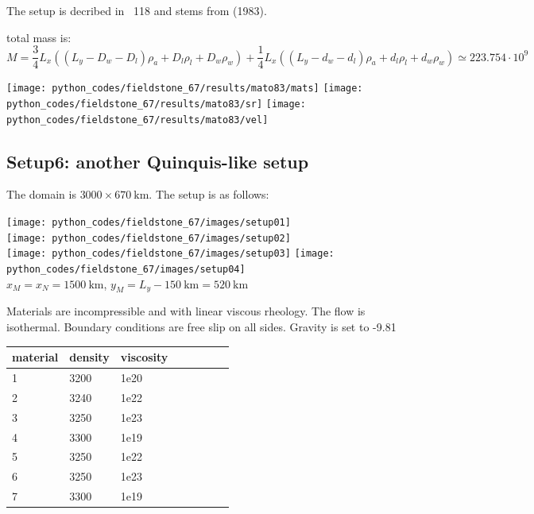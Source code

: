 The setup is decribed in \stone~118 and stems from \textcite{mato83} (1983). 

total mass is:
\[
M=\frac34 L_x \left( (L_y-D_w-D_l) \rho_a + D_l \rho_l + D_w \rho_w \right)
+ \frac14 L_x \left( (L_y-d_w-d_l) \rho_a + d_l \rho_l + d_w \rho_w \right)
\simeq 223.754\cdot10^9 
\]


\begin{center}
\texttt{[image: python\_codes/fieldstone\_67/results/mato83/mats]}
\texttt{[image: python\_codes/fieldstone\_67/results/mato83/sr]}
\texttt{[image: python\_codes/fieldstone\_67/results/mato83/vel]}
\end{center}



\newpage
\subsection*{Setup6: another Quinquis-like setup}

The domain is $3000\times 670~\si{\km}$. The setup is as follows:

\begin{center}
\texttt{[image: python\_codes/fieldstone\_67/images/setup01]}\\
\texttt{[image: python\_codes/fieldstone\_67/images/setup02]}\\
\texttt{[image: python\_codes/fieldstone\_67/images/setup03]}
\texttt{[image: python\_codes/fieldstone\_67/images/setup04]}\\
{\captionfont $x_M=x_N=1500~\si{\km}$, $y_M=L_y-150~\si{\km}=520~\si{\km}$}
\end{center}

Materials are incompressible and with linear viscous rheology. The
flow is isothermal. Boundary conditions are free slip on all
sides. Gravity is set to -9.81

\begin{center}
\begin{tabular}{llllllll}
\hline
material & density & viscosity \\
\hline\hline
1& 3200& 1e20\\ 
2& 3240& 1e22\\
3& 3250& 1e23\\
4& 3300& 1e19\\
5& 3250& 1e22\\
6& 3250& 1e23\\
7& 3300& 1e19\\
\hline
\end{tabular}
\end{center}

